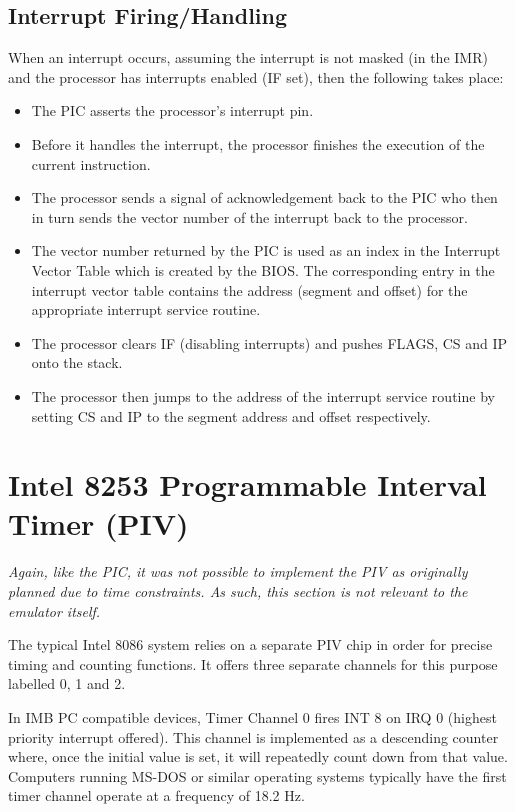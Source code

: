     \subsection{Interrupt Firing/Handling}
        When an interrupt occurs, assuming the interrupt is not masked (in the IMR) and the processor has interrupts enabled (IF set), then the following takes place:
        
        \begin{itemize}
            \item The PIC asserts the processor's interrupt pin.
            \item Before it handles the interrupt, the processor finishes the execution of the current instruction.
            \item The processor sends a signal of acknowledgement back to the PIC who then in turn sends the vector number of the interrupt back to the processor.
            \item The vector number returned by the PIC is used as an index in the Interrupt Vector Table which is created by the BIOS. The corresponding entry in the interrupt vector table contains the address (segment and offset) for the appropriate interrupt service routine.
            \item The processor clears IF (disabling interrupts) and pushes FLAGS, CS and IP onto the stack.
            \item The processor then jumps to the address of the interrupt service routine by setting CS and IP to the segment address and offset respectively.
        \end{itemize}

\section{Intel 8253 Programmable Interval Timer (PIV)}
    \textit{Again, like the PIC, it was not possible to implement the PIV as originally planned due to time constraints. As such, this section is not relevant to the emulator itself.}

    The typical Intel 8086 system relies on a separate PIV chip in order for precise timing and counting functions. It offers three separate channels for this purpose labelled 0, 1 and 2.

    In IMB PC compatible devices, Timer Channel 0 fires INT 8 on IRQ 0 (highest priority interrupt offered). This channel is implemented as a descending counter where, once the initial value is set, it will repeatedly count down from that value. Computers running MS-DOS or similar operating systems typically have the first timer channel operate at a frequency of 18.2 Hz.

